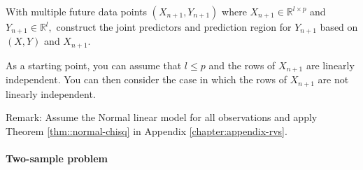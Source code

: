 With multiple future data points $(X_{n+1},Y_{n+1})$ where $X_{n+1}\in\mathbb{R}^{l\times p}$
and $Y_{n+1}\in\mathbb{R}^{l},$ construct the joint predictors and
prediction region for $Y_{n+1}$ based on $(X,Y)$ and $X_{n+1}$. 


As a starting point, you can assume that $l\leq p$ and the rows of $X_{n+1}$ are linearly independent. You can then consider the case in which the rows of $X_{n+1}$ are not linearly independent.  


Remark: Assume the Normal linear model for all observations and apply Theorem \ref{thm::normal-chisq} in Appendix \ref{chapter:appendix-rvs}. 




\paragraph{Two-sample problem}\label{hw5::two-sample}

